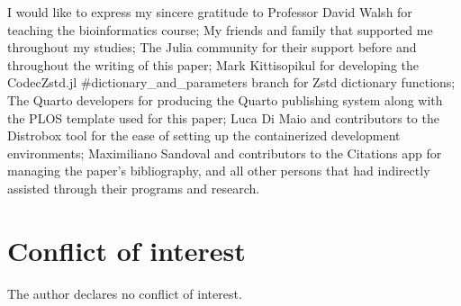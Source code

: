 \documentclass[
  10pt,
  letterpaper,
]{article}
\begin{document}
I would like to express my sincere gratitude to Professor David Walsh
for teaching the bioinformatics course; My friends and family that
supported me throughout my studies; The Julia community for their
support before and throughout the writing of this paper; Mark
Kittisopikul for developing the CodecZstd.jl
\#dictionary\_and\_parameters branch for Zstd dictionary functions; The
Quarto developers for producing the Quarto publishing
system\citep{Allaire_Quarto_2022} along with the PLOS template used for
this paper; Luca Di Maio and contributors to the Distrobox tool for the
ease of setting up the containerized development
environments\citep{maio}; Maximiliano Sandoval and contributors to the
Citations app for managing the paper's bibliography\citep{sandoval}, and
all other persons that had indirectly assisted through their programs
and research.

\hypertarget{conflict-of-interest}{%
\section{Conflict of interest}\label{conflict-of-interest}}

The author declares no conflict of interest.


\nolinenumbers
  
\end{document}
